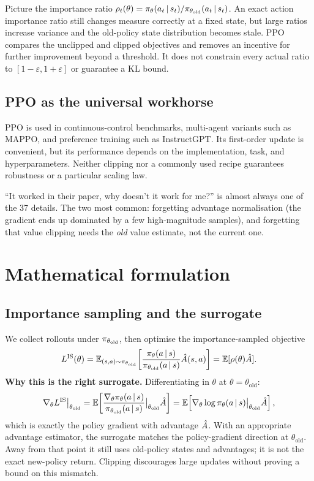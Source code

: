 \documentclass[11pt,oneside]{scrbook}
\begin{document}
\begin{intuition}
Picture the importance ratio $\rho_t(\theta) = \pi_\theta(a_t\,\vert\, s_t)/\pi_{\theta_\text{old}}(a_t\,\vert\, s_t)$. An exact action importance ratio still changes measure correctly at a fixed state, but large ratios increase variance and the old-policy state distribution becomes stale. PPO compares the unclipped and clipped objectives and removes an incentive for further improvement beyond a threshold. It does not constrain every actual ratio to $[1-\varepsilon,1+\varepsilon]$ or guarantee a KL bound.
\end{intuition}

\section*{PPO as the universal workhorse}
PPO is used in continuous-control benchmarks, multi-agent variants such as
MAPPO, and preference training such as InstructGPT. Its first-order update
is convenient, but its performance depends on the implementation, task, and
hyperparameters. Neither clipping nor a commonly used recipe guarantees
robustness or a particular scaling law.

\begin{pitfall}
``It worked in their paper, why doesn't it work for me?'' is almost always one of the 37 details. The two most common: forgetting advantage normalisation (the gradient ends up dominated by a few high-magnitude samples), and forgetting that value clipping needs the \emph{old} value estimate, not the current one.
\end{pitfall}

\chapter{Mathematical formulation}

\section{Importance sampling and the surrogate}

We collect rollouts under $\pi_{\theta_\text{old}}$, then optimise the importance-sampled objective
\[
  L^{\mathrm{IS}}(\theta) = \mathbb{E}_{(s,a)\sim\pi_{\theta_\text{old}}}\!\left[\frac{\pi_\theta(a\,\vert\, s)}{\pi_{\theta_\text{old}}(a\,\vert\, s)} \hat{A}(s,a)\right] = \mathbb{E}[\rho(\theta)\hat{A}].
\]
\textbf{Why this is the right surrogate.} Differentiating in $\theta$ at $\theta=\theta_\text{old}$:
\[
  \nabla_\theta L^{\mathrm{IS}}\big|_{\theta_\text{old}}
  = \mathbb{E}\!\left[\frac{\nabla_\theta \pi_\theta(a\,\vert\, s)}{\pi_{\theta_\text{old}}(a\,\vert\, s)}\big|_{\theta_\text{old}} \hat{A}\right]
  = \mathbb{E}\!\left[\nabla_\theta \log\pi_\theta(a\,\vert\, s)\big|_{\theta_\text{old}} \hat{A}\right],
\]
which is exactly the policy gradient with advantage $\hat{A}$. With an appropriate advantage estimator, the surrogate matches the policy-gradient direction at $\theta_\text{old}$. Away from that point it still uses old-policy states and advantages; it is not the exact new-policy return. Clipping discourages large updates without proving a bound on this mismatch.
\end{document}
